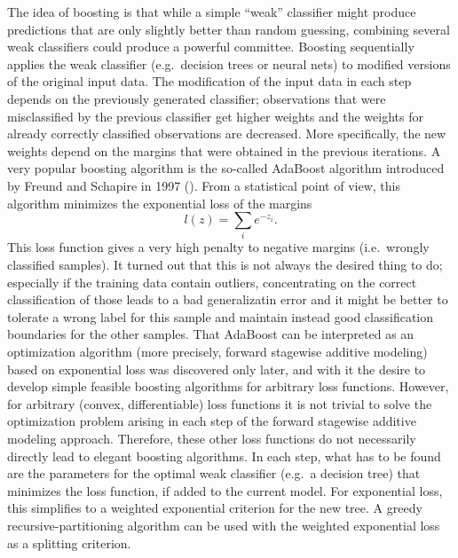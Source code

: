 The idea of boosting is that while a simple ``weak'' classifier might produce predictions that are only slightly better than random guessing, combining several weak classifiers could produce a powerful committee. 
Boosting sequentially applies the weak classifier (e.g.\ decision trees or neural nets) to modified versions of the original input data. 
The modification of the input data in each step depends on the previously generated classifier; observations that were misclassified by the previous classifier get higher weights and the weights for already correctly classified observations are decreased. More specifically, the new weights depend on the margins that were obtained in the previous iterations. 
A very popular boosting algorithm is the so-called AdaBoost algorithm introduced by Freund and Schapire in 1997 (\cite{freund1997decision}). 
From a statistical point of view, this algorithm minimizes the exponential loss of the margins
$$l(z) = \sum_i e^{-z_i}.$$
This loss function gives a very high penalty to negative margins (i.e.\ wrongly classified samples). 
It turned out that this is not always the desired thing to do; especially if the training data contain outliers, concentrating on the correct classification of those leads to a bad generalizatin error and it might be better to tolerate a wrong label for this sample and maintain instead good classification boundaries for the other samples. 
That AdaBoost can be interpreted as an optimization algorithm (more precisely, forward stagewise additive modeling) based on exponential loss was discovered only later, and with it the desire to develop simple feasible boosting algorithms for arbitrary loss functions. 
However, for arbitrary (convex, differentiable) loss functions it is not trivial to solve the optimization problem arising in each step of the forward stagewise additive modeling approach. Therefore, these other loss functions do not necessarily directly lead to elegant boosting algorithms. 
In each step, what has to be found are the parameters for the optimal weak classifier (e.g.\ a decision tree) that minimizes the loss function, if added to the current model. 
For exponential loss, this simplifies to a weighted exponential criterion for the new tree. A greedy recursive-partitioning algorithm can be used with the weighted exponential loss as a splitting criterion. 

